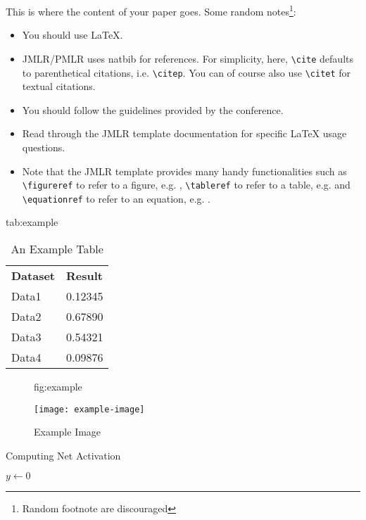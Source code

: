 \documentclass{midl} %
\begin{document}
This is where the content of your paper goes.  Some random
notes\footnote{Random footnote are discouraged}:
\begin{itemize}
\item You should use \LaTeX \cite{Lamport:Book:1989}.
\item JMLR/PMLR uses natbib for references. For simplicity, here, \verb|\cite|  defaults to
  parenthetical citations, i.e. \verb|\citep|. You can of course also
  use \verb|\citet| for textual citations.
\item You should follow the guidelines provided by the conference.
\item Read through the JMLR template documentation for specific \LaTeX
  usage questions.
\item Note that the JMLR template provides many handy functionalities
such as \verb|\figureref| to refer to a figure,
e.g. ,  \verb|\tableref| to refer to a table,
e.g.  and \verb|\equationref| to refer to an equation,
e.g. .
\end{itemize}

\begin{table}[htbp]
\floatconts
  {tab:example}%
  {\caption{An Example Table}}%
  {\begin{tabular}{ll}
  \bfseries Dataset & \bfseries Result\\
  Data1 & 0.12345\\
  Data2 & 0.67890\\
  Data3 & 0.54321\\
  Data4 & 0.09876
  \end{tabular}}
\end{table}

\begin{figure}[htbp]
\floatconts
  {fig:example}
  {\caption{Example Image}}
  {\texttt{[image: example-image]}}
\end{figure}

\begin{algorithm2e}
\caption{Computing Net Activation}
\label{alg:net}
{}
$y\leftarrow 0$\;
\end{algorithm2e}
\end{document}
